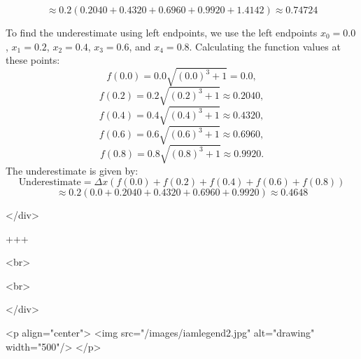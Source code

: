 \[\approx 0.2 \left( 0.2040 + 0.4320 + 0.6960 + 0.9920 + 1.4142 \right) \approx 0.74724\]


To find the underestimate using left endpoints, we use the left endpoints \(x_0 = 0.0\), \(x_1 = 0.2\), \(x_2 = 0.4\), \(x_3 = 0.6\), and \(x_4 = 0.8\).
Calculating the function values at these points:
\[f(0.0) = 0.0 \sqrt{(0.0)^3 + 1} = 0.0,\]
\[f(0.2) = 0.2 \sqrt{(0.2)^3 + 1} \approx 0.2040,\]
\[f(0.4) = 0.4 \sqrt{(0.4)^3 + 1} \approx 0.4320,\]
\[f(0.6) = 0.6 \sqrt{(0.6)^3 + 1} \approx 0.6960,\]
\[f(0.8) = 0.8 \sqrt{(0.8)^3 + 1} \approx 0.9920.\]
The underestimate is given by:
\[\text{Underestimate} = \Delta x \left( f(0.0) + f(0.2) + f(0.4) + f(0.6) + f(0.8) \right)\]
\[\approx 0.2 \left( 0.0 + 0.2040 + 0.4320 + 0.6960 + 0.9920 \right) \approx 0.4648\]

</div>

+++

<br>

<br>

</div>

<p align="center">
<img src="/images/iamlegend2.jpg" alt="drawing" width="500"/>
</p>
